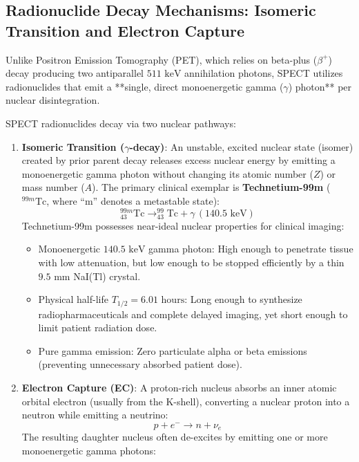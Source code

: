 \documentclass[11pt,a4paper]{article}
\begin{document}
\subsection{Radionuclide Decay Mechanisms: Isomeric Transition and Electron Capture}
Unlike Positron Emission Tomography (PET), which relies on beta-plus ($\beta^+$) decay producing two antiparallel $511\text{ keV}$ annihilation photons, SPECT utilizes radionuclides that emit a **single, direct monoenergetic gamma ($\gamma$) photon** per nuclear disintegration.

SPECT radionuclides decay via two nuclear pathways:
\begin{enumerate}[leftmargin=*]
    \item \textbf{Isomeric Transition ($\gamma$-decay)}: An unstable, excited nuclear state (isomer) created by prior parent decay releases excess nuclear energy by emitting a monoenergetic gamma photon without changing its atomic number ($Z$) or mass number ($A$). The primary clinical exemplar is \textbf{Technetium-99m} ($^{99m}\text{Tc}$, where ``m'' denotes a metastable state):
    \begin{equation}
        ^{99m}_{43}\text{Tc} \to ^{99}_{43}\text{Tc} + \gamma \, (140.5\text{ keV})
    \end{equation}
    Technetium-99m possesses near-ideal nuclear properties for clinical imaging:
    \begin{itemize}
        \item Monoenergetic $140.5\text{ keV}$ gamma photon: High enough to penetrate tissue with low attenuation, but low enough to be stopped efficiently by a thin $9.5\text{ mm}$ NaI(Tl) crystal.
        \item Physical half-life $T_{1/2} = 6.01\text{ hours}$: Long enough to synthesize radiopharmaceuticals and complete delayed imaging, yet short enough to limit patient radiation dose.
        \item Pure gamma emission: Zero particulate alpha or beta emissions (preventing unnecessary absorbed patient dose).
    \end{itemize}
    \item \textbf{Electron Capture (EC)}: A proton-rich nucleus absorbs an inner atomic orbital electron (usually from the K-shell), converting a nuclear proton into a neutron while emitting a neutrino:
    \begin{equation}
        p + e^- \to n + \nu_e
    \end{equation}
    The resulting daughter nucleus often de-excites by emitting one or more monoenergetic gamma photons:

\end{enumerate}
\end{document}
